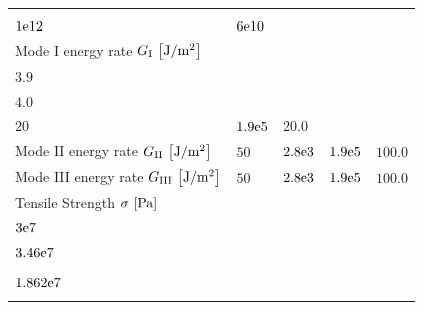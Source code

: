\documentclass[format=acmtog,12pt,screen=true,review=false,natbib=false,]{acmart}
\begin{document}
\begin{table}[!h]
\begin{tabular*}{\columnwidth}{llllr}
        & \begin{tabular}[t]{@{}l@{}}
            $4.4{\rm{e}}2$ \\
            $1{\rm{e}}12$ \cite{Che18}
        \end{tabular}
    
        & $6{\rm{e}}10$ \\[1em]

    Mode I energy rate $G_{\rm{I}}\,\left[{\rm{J}}/{\rm{m}}^2\right]$ & 
    
    \begin{tabular}[t]{@{}l@{}}
            $10$ \cite{Xu10} \\
            $3.9$ \cite{Che18} \\
            $4.0$ \cite{Che18}
        \end{tabular}
        
    & \begin{tabular}[t]{@{}l@{}}
            $2.8{\rm{e}}3$ \cite{Hoo17} \\
            $20$ \cite{Che18}
        \end{tabular}  
    
    & $1.9{\rm{e}}5$ \cite{Sta00} & $20.0$\\[1em]

    Mode II energy rate $G_{\rm{II}}\,\left[{\rm{J}}/{\rm{m}}^2\right]$ & $50$ \cite{Xu10} & $2.8{\rm{e}}3$ & $1.9{\rm{e}}5$ & $100.0$ \\[1em]
    
    Mode III energy rate $G_{\rm{III}}\,\left[{\rm{J}}/{\rm{m}}^2\right]$ & $50$ \cite{Xu10} & $2.8{\rm{e}}3$ & $1.9{\rm{e}}5$ & $100.0$ \\[1em]
    
    Tensile Strength $\sigma\,\left[{\rm{Pa}}\right]$ & \begin{tabular}[t]{@{}l@{}}
            $6{\rm{e}}7$ \cite{Che15}\\
            $3{\rm{e}}7$ \cite{Che18}\\
            $3.46{\rm{e}}7$ \cite{Che18}\\
        \end{tabular}
        
        & \begin{tabular}[t]{@{}l@{}}
            $2{\rm{e}}7$ \cite{Zan12}\\
            $1.862{\rm{e}}7$ \cite{Che18}\\
        \end{tabular}
        

\end{tabular*}
\end{table}
\end{document}

